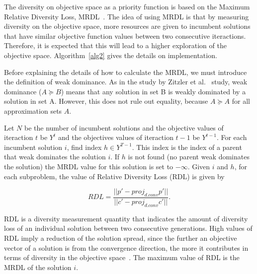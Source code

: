 The diversity on objective space as a priority function  is based on the Maximum Relative Diversity Loss, MRDL~\cite{gee2015online}.  The idea of using MRDL is that by measuring diversity on the objective space, more resources are given to incumbent solutions that have similar objective function values between two consecutive iteractions. Therefore, it is expected that this will lead to a higher exploration of the objective space. Algorithm~\ref{alg2} gives the details on implementation.

 
Before explaining the details of how to calculate the MRDL, we must introduce the definition of weak dominance. As in the study by Zitzler et al.~\cite{zitzler2003performance} study, weak dominance ($A \succeq B$) means that any solution in set B is weakly dominated by a solution in set A. However, this does not rule out equality, because $A \succeq A$ for all approximation sets $A$.

Let $N$ be the number of incumbent solutions and the objective values of iteraction $t$ be $Y^t$ and the objectives values of iteraction $t-1$ be $Y^{t-1}$. For each incumbent solution $i$, find index $h \in Y^{T-1}$. This index is the index of a parent that weak dominates the solution $i$. If $h$ is not found (no parent weak dominates the solution) the MRDL value for this solution is set to $-\infty$. Given $i$ and $h$, for each subproblem, the value of Relative Diversity Loss (RDL) is given by 

\begin{equation}
RDL = \dfrac{ ||p \prime - proj_{d.conv}p \prime|| }{||c \prime - proj_{d.conv}c \prime||}.
\end{equation}



RDL is a diversity measurement quantity that indicates the amount of diversity loss of an individual solution between two consecutive generations. High values of RDL imply a reduction of the solution spread, since the further an objective vector of a solution is from the convergence direction, the more it contributes in terms of diversity in the objective space~\cite{gee2015online}. The maximum value of RDL is the MRDL of the solution $i$.




